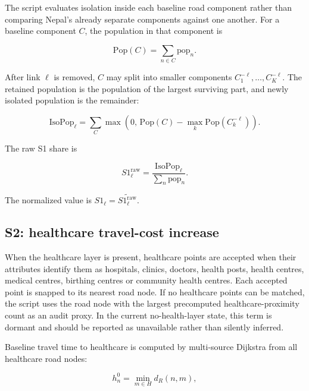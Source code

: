 \documentclass[11pt,a4paper]{article}
\begin{document}
The script evaluates isolation inside each baseline road component rather than
comparing Nepal's already separate components against one another. For a
baseline component $C$, the population in that component is

\begin{equation}
\mathrm{Pop}(C)=\sum_{n\in C}\mathrm{pop}_n.
\end{equation}

After link $\ell$ is removed, $C$ may split into smaller components
$C^{-\ell}_1,\ldots,C^{-\ell}_K$. The retained population is the population of
the largest surviving part, and newly isolated population is the remainder:

\begin{equation}
\mathrm{IsoPop}_{\ell}
=\sum_{C}
\max\left(
0,\,
\mathrm{Pop}(C)-\max_k \mathrm{Pop}(C^{-\ell}_k)
\right).
\label{eq:mlpi-isopop}
\end{equation}

The raw S1 share is

\begin{equation}
S1^{\mathrm{raw}}_{\ell}
=\frac{\mathrm{IsoPop}_{\ell}}
        {\sum_n \mathrm{pop}_n}.
\label{eq:mlpi-s1-raw}
\end{equation}

The normalized value is $S1_{\ell}=\widetilde{S1^{\mathrm{raw}}_{\ell}}$.

\subsection{S2: healthcare travel-cost increase}

When the healthcare layer is present, healthcare points are accepted when their
attributes identify them as hospitals, clinics, doctors, health posts, health
centres, medical centres, birthing centres or community health centres. Each
accepted point is snapped to its nearest road node. If no healthcare points can
be matched, the script uses the road node with the largest precomputed
healthcare-proximity count as an audit proxy. In the current no-health-layer
state, this term is dormant and should be reported as unavailable rather than
silently inferred.

Baseline travel time to healthcare is computed by multi-source Dijkstra from
all healthcare road nodes:

\begin{equation}
h^0_n=\min_{m\in H} d_R(n,m),
\label{eq:mlpi-health-base}
\end{equation}
\end{document}

